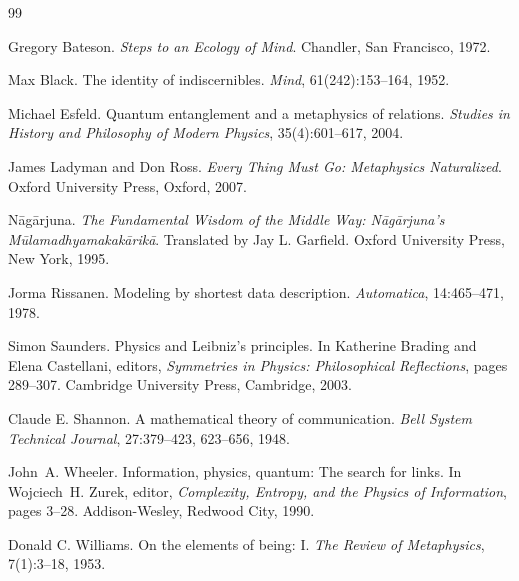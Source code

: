 \documentclass[11pt,a4paper]{article}
\begin{document}
\begin{thebibliography}{99}
\itemsep=2pt

Gregory Bateson.
\newblock \emph{Steps to an Ecology of Mind}.
\newblock Chandler, San Francisco, 1972.

Max Black.
\newblock The identity of indiscernibles.
\newblock \emph{Mind}, 61(242):153--164, 1952.

Michael Esfeld.
\newblock Quantum entanglement and a metaphysics of relations.
\newblock \emph{Studies in History and Philosophy of Modern Physics}, 35(4):601--617, 2004.

James Ladyman and Don Ross.
\newblock \emph{Every Thing Must Go: Metaphysics Naturalized}.
\newblock Oxford University Press, Oxford, 2007.

N\=ag\=arjuna.
\newblock \emph{The Fundamental Wisdom of the Middle Way: N\=ag\=arjuna's M\=ulamadhyamakak\=arik\=a}.
\newblock Translated by Jay L. Garfield. Oxford University Press, New York, 1995.

Jorma Rissanen.
\newblock Modeling by shortest data description.
\newblock \emph{Automatica}, 14:465--471, 1978.

Simon Saunders.
\newblock Physics and Leibniz's principles.
\newblock In Katherine Brading and Elena Castellani, editors, \emph{Symmetries in Physics:
Philosophical Reflections}, pages 289--307. Cambridge University Press, Cambridge, 2003.

Claude E. Shannon.
\newblock A mathematical theory of communication.
\newblock \emph{Bell System Technical Journal}, 27:379--423, 623--656, 1948.

John~A. Wheeler.
\newblock Information, physics, quantum: The search for links.
\newblock In Wojciech~H. Zurek, editor, \emph{Complexity, Entropy, and the Physics of Information},
pages 3--28. Addison-Wesley, Redwood City, 1990.

Donald C. Williams.
\newblock On the elements of being: I.
\newblock \emph{The Review of Metaphysics}, 7(1):3--18, 1953.

\end{thebibliography}
\end{document}
